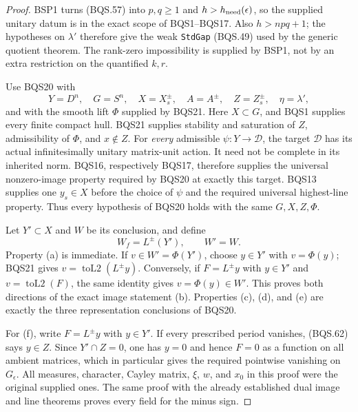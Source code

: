 \documentclass[11pt,a4paper]{article}
\numberwithin{equation}{section}
\theoremstyle{remark}\newtheorem{remark}[theorem]{Remark}
\begin{document}
\begin{proof}
BSP1 turns (BQS.57) into $p,q\ge1$ and
$h>h_{\rm need}(\epsilon)$, so the supplied unitary datum is in
the exact scope of BQS1--BQS17.
Also $h>npq+1$; the hypotheses on $\lambda'$ therefore give
the weak \texttt{Std\allowbreak Gap} (BQS.49) used by the generic quotient
theorem.  The rank-zero impossibility is supplied by BSP1,
not by an extra restriction on the quantified $k,r$.

Use BQS20 with
\[
 Y=D^n,\quad G=S^n,\quad X=X_s^\pm,\quad
 A=A^\pm,\quad Z=Z_s^\pm,\quad \eta=\lambda',
 \tag{BQS.66}
\]
and with the smooth lift $\Phi$ supplied by BQS21.
Here $X\subset G$, and BQS1 supplies every finite compact hull.
BQS21 supplies stability and saturation of $Z$, admissibility
of $\Phi$, and $x\notin Z$.
For \emph{every} admissible $\psi:Y\to\mathcal D$, the target
$\mathcal D$ has its actual infinitesimally unitary matrix-unit
action.  It need not be complete in its inherited norm.
BQS16, respectively BQS17, therefore supplies the universal
nonzero-image property required by BQS20 at exactly this target.
BQS13 supplies one $y_s\in X$ before the choice of $\psi$ and
the required universal highest-line property.
Thus every hypothesis of BQS20 holds with the same $G,X,Z,\Phi$.

Let $Y'\subset X$ and $W$ be its conclusion, and define
\[
                         W_f=L^\pm(Y'),\qquad W'=W.
 \tag{BQS.67}
\]
Property (a) is immediate.
If $v\in W'=\Phi(Y')$, choose $y\in Y'$ with $v=\Phi(y)$;
BQS21 gives $v=\operatorname{toL2}(L^\pm y)$.
Conversely, if $F=L^\pm y$ with $y\in Y'$ and
$v=\operatorname{toL2}(F)$, the same identity gives $v=\Phi(y)\in W'$.
This proves both directions of the exact image statement (b).
Properties (c), (d), and (e) are exactly the three representation
conclusions of BQS20.

For (f), write $F=L^\pm y$ with $y\in Y'$.
If every prescribed period vanishes, (BQS.62) says $y\in Z$.
Since $Y'\cap Z=0$, one has $y=0$ and hence $F=0$ as a function
on all ambient matrices, which in particular gives the required
pointwise vanishing on $G_\epsilon$.
All measures, character, Cayley matrix, $\xi$, $w$, and $x_0$
in this proof were the original supplied ones.
The same proof with the already established dual image and
line theorems proves every field for the minus sign.
\end{proof}

\end{document}
